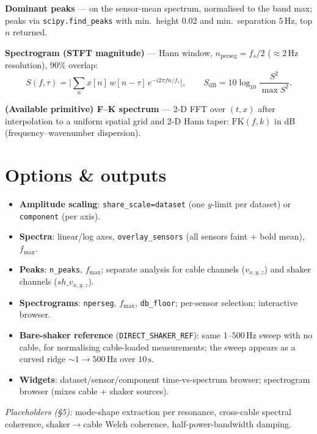 \documentclass[11pt,a4paper]{article}
\newcommand{\unit}[1]{\,\mathrm{#1}}
\begin{document}
\textbf{Dominant peaks} --- on the sensor-mean spectrum, normalised to the band max; peaks via
\texttt{scipy.find\_peaks} with min.\ height $0.02$ and min.\ separation $5\unit{Hz}$, top $n$ returned.

\textbf{Spectrogram (STFT magnitude)} --- Hann window, $n_{\mathrm{perseg}}=f_s/2$ ($\approx2\unit{Hz}$
resolution), $90\%$ overlap:
\begin{equation}
S(f,\tau)=\Big|\sum_{n} x[n]\,w[n-\tau]\,e^{-i2\pi f n/f_s}\Big|,\qquad
S_{\mathrm{dB}}=10\log_{10}\!\frac{S^2}{\max S^2}.
\end{equation}

\textbf{(Available primitive) F--K spectrum} --- 2-D FFT over $(t,x)$ after interpolation to a uniform
spatial grid and 2-D Hann taper: $\mathrm{FK}(f,k)$ in dB (frequency--wavenumber dispersion).

\section*{Options \& outputs}
\begin{itemize}
\item \textbf{Amplitude scaling}: \texttt{share\_scale=}\texttt{dataset} (one $y$-limit per dataset) or \texttt{component} (per axis).
\item \textbf{Spectra}: linear/log axes, \texttt{overlay\_sensors} (all sensors faint + bold mean), $f_{\max}$.
\item \textbf{Peaks}: \texttt{n\_peaks}, $f_{\max}$; separate analysis for cable channels ($v_{x,y,z}$) and shaker channels ($sh\_v_{x,y,z}$).
\item \textbf{Spectrograms}: \texttt{nperseg}, $f_{\max}$, \texttt{db\_floor}; per-sensor selection; interactive browser.
\item \textbf{Bare-shaker reference} (\texttt{DIRECT\_SHAKER\_REF}): same $1$--$500\unit{Hz}$ sweep with no cable, for normalising cable-loaded measurements; the sweep appears as a curved ridge $\sim1\!\to\!500\unit{Hz}$ over $10\unit{s}$.
\item \textbf{Widgets}: dataset/sensor/component time-vs-spectrum browser; spectrogram browser (mixes cable + shaker sources).
\end{itemize}

\footnotesize\noindent\emph{Placeholders (\S5):} mode-shape extraction per resonance, cross-cable spectral coherence, shaker$\to$cable Welch coherence, half-power-bandwidth damping.
\end{document}
